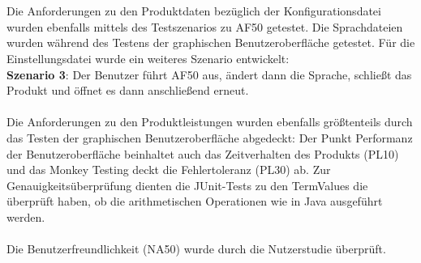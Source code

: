 \documentclass[parskip=full]{scrartcl}
\begin{document}
\\
 \\
Die Anforderungen zu den Produktdaten bezüglich der Konfigurationsdatei wurden ebenfalls mittels des Testszenarios zu AF50 getestet. Die Sprachdateien wurden während des Testens der graphischen Benutzeroberfläche getestet. Für die Einstellungsdatei wurde ein weiteres Szenario entwickelt: \\
\textbf{Szenario 3}: Der Benutzer führt AF50 aus, ändert dann die Sprache, schließt das Produkt und öffnet es dann anschließend erneut. \\
 \\
Die Anforderungen zu den Produktleistungen wurden ebenfalls größtenteils durch das Testen der graphischen Benutzeroberfläche abgedeckt: Der Punkt Performanz der Benutzeroberfläche beinhaltet auch das Zeitverhalten des Produkts (PL10) und das Monkey Testing deckt die Fehlertoleranz (PL30) ab. Zur Genauigkeitsüberprüfung dienten die JUnit-Tests zu den TermValues die überprüft haben, ob die arithmetischen Operationen wie in Java ausgeführt werden. \\
 \\
Die Benutzerfreundlichkeit (NA50) wurde durch die Nutzerstudie überprüft. 
\end{document}
